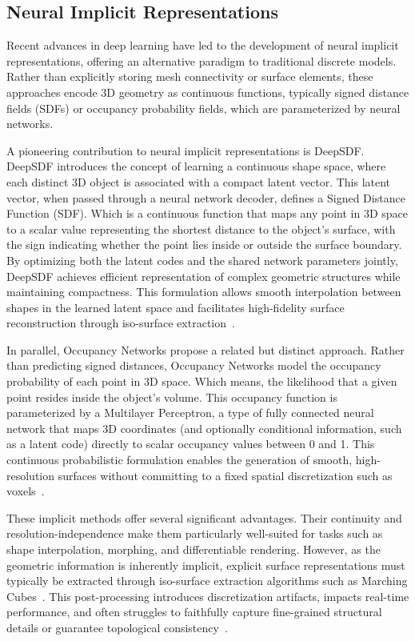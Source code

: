 \subsection{Neural Implicit Representations}

Recent advances in deep learning have led to the development of neural implicit representations, offering an alternative paradigm to traditional discrete models.  
Rather than explicitly storing mesh connectivity or surface elements, these approaches encode 3D geometry as continuous functions, typically signed distance fields (SDFs) or occupancy probability fields, which are parameterized by neural networks.  

A pioneering contribution to neural implicit representations is DeepSDF.  
DeepSDF introduces the concept of learning a continuous shape space, where each distinct 3D object is associated with a compact latent vector.  
This latent vector, when passed through a neural network decoder, defines a Signed Distance Function (SDF).  
Which is a continuous function that maps any point in 3D space to a scalar value representing the shortest distance to the object's surface, with the sign indicating whether the point lies inside or outside the surface boundary.  
By optimizing both the latent codes and the shared network parameters jointly, DeepSDF achieves efficient representation of complex geometric structures while maintaining compactness.  
This formulation allows smooth interpolation between shapes in the learned latent space and facilitates high-fidelity surface reconstruction through iso-surface extraction~\cite{park2019}.  

In parallel, Occupancy Networks propose a related but distinct approach.  
Rather than predicting signed distances, Occupancy Networks model the occupancy probability of each point in 3D space.  
Which means, the likelihood that a given point resides inside the object's volume.  
This occupancy function is parameterized by a Multilayer Perceptron, a type of fully connected neural network that maps 3D coordinates (and optionally conditional information, such as a latent code) directly to scalar occupancy values between 0 and 1.  
This continuous probabilistic formulation enables the generation of smooth, high-resolution surfaces without committing to a fixed spatial discretization such as voxels~\cite{mescheder2019}.  

These implicit methods offer several significant advantages.  
Their continuity and resolution-independence make them particularly well-suited for tasks such as shape interpolation, morphing, and differentiable rendering.  
However, as the geometric information is inherently implicit, explicit surface representations must typically be extracted through iso-surface extraction algorithms such as Marching Cubes~\cite{lorensen1987}.  
This post-processing introduces discretization artifacts, impacts real-time performance, and often struggles to faithfully capture fine-grained structural details or guarantee topological consistency~\cite{sitzmann2020}.  

